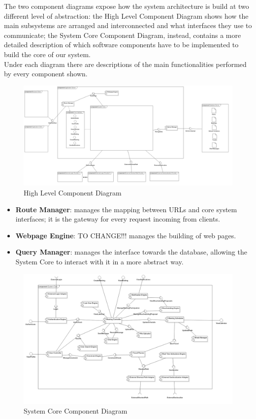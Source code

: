 The two component diagrams expose how the system architecture is build at two different level of abstraction: the High Level Component Diagram shows how the main subsystems are arranged and interconnected and what interfaces they use to communicate; the System Core Component Diagram, instead, contains a more detailed description of which software components have to be implemented to build the core of our system.\\
Under each diagram there are descriptions of the main functionalities performed by every component shown.

\begin{figure}[H]
\centering\includegraphics[width=\textwidth]{Images/UMLDiagrams/HighLevelComponentDiagram.png}
\caption{High Level Component Diagram}
\end{figure}

\begin{itemize}
\item \textbf{Route Manager}: manages the mapping between URLs and core system interfaces; it is the gateway for every request incoming from clients.
\item \textbf{Webpage Engine}: TO CHANGE!!! manages the building of web pages.
\item \textbf{Query Manager}: manages the interface towards the database, allowing the System Core to interact with it in a more abstract way.
\end{itemize}

\begin{figure}[H]
\centering\includegraphics[width=\textwidth]{Images/UMLDiagrams/ApplicationComponentDiagram.png}
\caption{System Core Component Diagram}
\end{figure}

